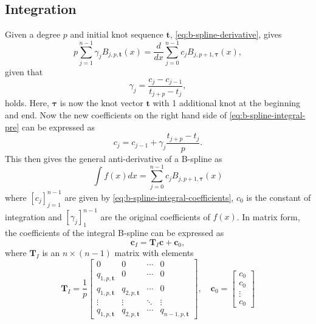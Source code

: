 \subsection{Integration}
Given a degree $p$ and initial knot sequence $\mathbf t$, \cref{eq:b-spline-derivative}, gives
\begin{equation}\label{eq:b-spline-integral-pre}
    p \sum_{j=1}^{n-1} \gamma_j B_{j, p, \boldsymbol{t}}(x) 
    = \frac{d}{dx} \sum_{j=0}^{n-1} c_j B_{j, p+1, \boldsymbol{\tau}}(x),
\end{equation}
given that
\begin{equation}
    \gamma_j = \frac{c_j-c_{j-1}}{t_{j+p}-t_j},
\end{equation}
holds. Here, $\boldsymbol{\tau}$ is now the knot vector $\mathbf{t}$ with 1 additional knot at the beginning and end. Now
the new coefficients on the right hand side of \cref{eq:b-spline-integral-pre} can be expressed as 
\begin{equation}\label{eq:b-spline-integral-coefficients}
    c_j = c_{j-1} + \gamma_j \frac{t_{j+p}-t_j}{p}.
\end{equation}
This then gives the general anti-derivative of a B-spline as
\begin{equation}\label{eq:b-spline-integral}
    \int f(x) dx = \sum_{j=0}^{n-1} c_j B_{j, p+1, \boldsymbol{\tau}}(x)
\end{equation}
where $[c_j]_{j=1}^{n-1}$ are given by \cref{eq:b-spline-integral-coefficients}, $c_0$ is the constant of integration and $[\gamma_j]_1^{n-1}$ are the original coefficients of $f(x)$. In matrix form, the coefficients of the integral B-spline can be expressed as
\begin{equation}\label{eq:b-spline-integral-matrix}
    \mathbf{c}_I = \mathbf T_I \mathbf{c} + \mathbf{c}_0,
\end{equation}
where $\mathbf T_I$ is an $n \times (n-1)$ matrix with elements
\begin{equation}
    \mathbf T_I = \frac{1}{p}\begin{bmatrix}
        0 & 0 & \cdots & 0 \\
        q_{1,p,\mathbf{t}} & 0 & \cdots & 0 \\
        q_{1,p,\mathbf{t}} & q_{2,p,\mathbf{t}} & \cdots & 0 \\
        \vdots & \vdots & \ddots & \vdots \\
        q_{1,p,\mathbf{t}} & q_{2,p,\mathbf{t}} & \cdots & q_{n-1,p,\mathbf{t}}
    \end{bmatrix},\quad
    \mathbf{c}_0 = \begin{bmatrix}
        c_0 \\
        c_0 \\
        \vdots \\
        c_0
    \end{bmatrix}
\end{equation}


